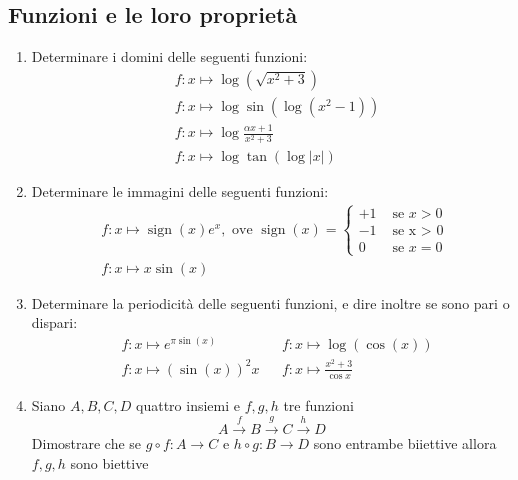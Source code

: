 \subsection{Funzioni e le loro proprietà}
\begin{enumerate}
	\item Determinare i domini delle seguenti funzioni:
	      \begin{align*}
		       & f:x \mapsto \log \left(\sqrt{x^2  + 3}\right)                \\
		       & f:x \mapsto \log \sin \left(\log \left(x^2  -1\right)\right) \\
		       & f:x \mapsto \log \frac{\alpha x +1}{x^2 +3}                  \\
		       & f:x \mapsto \log \tan \left(\log \left|x\right|\right)
	      \end{align*}
	\item Determinare le immagini delle seguenti funzioni:
	      \begin{align*}
		       & f : x \mapsto \operatorname{sign}\left(x\right)e^{x}, \text{ ove } \operatorname{sign}\left(x\right)
		      = \begin{cases}
			        +1 & \text{ se } x > 0 \\
			        -1 & \text{ se x > 0 } \\
			        0  & \text{ se } x = 0
		        \end{cases}                                                                                \\
		       & f: x \mapsto  x \sin \left(x\right)
	      \end{align*}
	\item Determinare la periodicità delle seguenti funzioni, e dire inoltre se sono pari o dispari:
	      \begin{align*}
		       & f : x \mapsto  e ^{ \pi  \sin \left(x\right)}      &  & f : x \mapsto \log \left(\cos \left(x\right)\right) \\
		       & f : x \mapsto \left(\sin \left(x\right)\right)^2 x &  & f : x \mapsto \frac{x^2  + 3}{\cos x}
	      \end{align*}
	\item Siano $ A, B , C , D $ quattro insiemi e $ f,g,h $ tre funzioni
	      \[
		      A \xrightarrow{f}B \xrightarrow{g} C \xrightarrow{h}D
	      \]
	      Dimostrare che se $g \circ f: A \rightarrow  C $ e $ h \circ g: B \rightarrow  D $ sono entrambe biiettive allora $ f,g,h  $ sono biettive
\end{enumerate}
